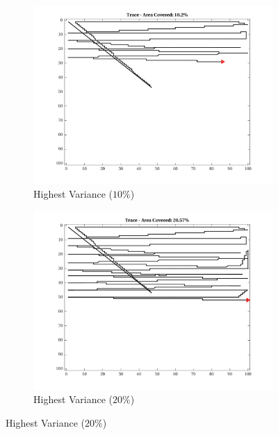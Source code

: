 \begin{figure}[htb!]
    \centering
        \begin{subfigure}[t]{0.32\textwidth}
        \centering
        \includegraphics[width=\linewidth]{figures/hbresults/path_nhv_10p_100x100_sf_1_seed_2.png}
        \ssp
        \captionsetup{skip=0.20\baselineskip,size=footnotesize}
        \caption{Highest Variance ($10\%$)}
    \end{subfigure}%
    \begin{subfigure}[t]{0.32\textwidth}
        \centering
        \includegraphics[width=\linewidth]{figures/hbresults/path_nhv_20p_100x100_sf_1_seed_2.png}
        \ssp
        \captionsetup{skip=0.20\baselineskip,size=footnotesize}
        \caption{Highest Variance ($20\%$)}

\end{subfigure}
\end{figure}
